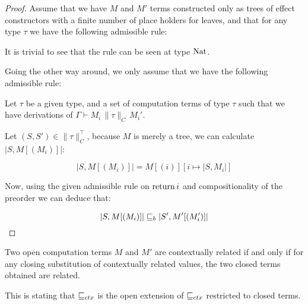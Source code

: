 \begin{ensps}
\begin{proof}
    Assume that we have $M$ and $M'$ terms constructed 
    only as trees of effect constructors with 
    a finite number of 
    place holders for leaves, and that for any type $\tau$
    we have the following admissible rule:


    \begin{prooftree}
    \end{prooftree}
    
    It is trivial to see that the rule can be seen 
    at type $\Nat$.

    Going the other way around, we only assume that 
    we have the following admissible rule:

    \begin{prooftree}
    \end{prooftree}

    Let $\tau$ be a given type, 
    and a set of computation terms 
    of type $\tau$ such that we have 
    derivations of $\Gamma \vdash M_i \, \| \tau \|_C \, M_i'$.

    Let $(S,S') \in \| \tau \|_C^\top$, because 
    $M$ is merely a tree, we can calculate $|S, M[(M_i)]|$:

    \begin{equation*}
        |S, M[(M_i)]| = 
        M[(i)] [ i \mapsto |S,M_i| ]
    \end{equation*}

    Now, using the given admissible rule on $\Ret i$ 
    and compositionality of the preorder we can 
    deduce that:

    \begin{equation*}
        |S, M[(M_i)]| \sqeq_b |S', M'[(M_i')] |
    \end{equation*}

\end{proof}
\end{ensps}


\begin{atheorem}
    Two open computation terms $M$ and $M'$ are contextually related 
    if and only if for any closing substitution of contextually related 
    values, the two closed terms obtained are related.

    This is stating that $\sqeq_{ctx}$ is the open extension of 
    $\sqeq_{ctx}$ restricted to closed terms.
\end{atheorem}

